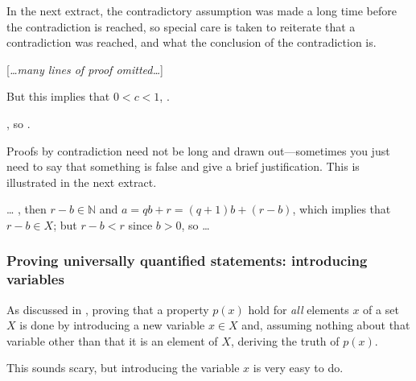 In the next extract, the contradictory assumption was made a long time before the contradiction is reached, so special care is taken to reiterate that a contradiction was reached, and what the conclusion of the contradiction is.

\begin{extract}
\label{xtrContradictionExampleTwo}

[\textit{\dots{}many lines of proof omitted\dots{}}]

But this implies that $0 < c < 1$, .

, so .
\end{extract}

Proofs by contradiction need not be long and drawn out---sometimes you just need to say that something is false and give a brief justification. This is illustrated in the next extract.

\begin{extract}
\label{xtrContradictionOneLineExample}
\dots{} , then $r-b \in \mathbb{N}$ and $a = qb+r = (q+1)b + (r-b)$, which implies that $r-b \in X$; but $r-b<r$ since $b>0$, so  \dots{}
\end{extract}

\subsubsection*{Proving universally quantified statements: introducing variables}

As discussed in , proving that a property $p(x)$ hold for \textit{all} elements $x$ of a set $X$ is done by introducing a new variable $x \in X$ and, assuming nothing about that variable other than that it is an element of $X$, deriving the truth of $p(x)$.

This sounds scary, but introducing the variable $x$ is very easy to do.

